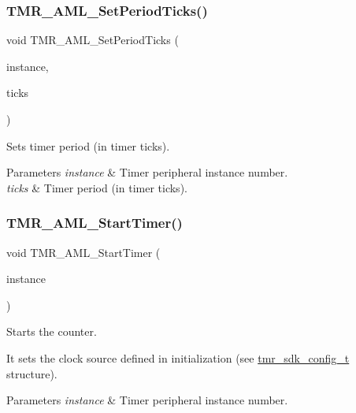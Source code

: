 \subsubsection{\texorpdfstring{TMR\_AML\_SetPeriodTicks()}{TMR\_AML\_SetPeriodTicks()}}
{\footnotesize\ttfamily void T\+M\+R\+\_\+\+A\+M\+L\+\_\+\+Set\+Period\+Ticks (\begin{DoxyParamCaption}\item[{\mbox{\hyperlink{common__aml_8h_a562bd37c7d07adcedec5993bc0cd96e5}{aml\+\_\+instance\+\_\+t}}}]{instance,  }\item[{uint32\+\_\+t}]{ticks }\end{DoxyParamCaption})}



Sets timer period (in timer ticks). 


\begin{DoxyParams}{Parameters}
{\em instance} & Timer peripheral instance number. \\
\hline
{\em ticks} & Timer period (in timer ticks). \\
\hline
\end{DoxyParams}
\mbox{\label{group__function__group_ga6ada6000f053895016184421976d8b74}} 
\subsubsection{\texorpdfstring{TMR\_AML\_StartTimer()}{TMR\_AML\_StartTimer()}}
{\footnotesize\ttfamily void T\+M\+R\+\_\+\+A\+M\+L\+\_\+\+Start\+Timer (\begin{DoxyParamCaption}\item[{\mbox{\hyperlink{common__aml_8h_a562bd37c7d07adcedec5993bc0cd96e5}{aml\+\_\+instance\+\_\+t}}}]{instance }\end{DoxyParamCaption})}



Starts the counter. 

It sets the clock source defined in initialization (see \mbox{\hyperlink{structtmr__sdk__config__t}{tmr\+\_\+sdk\+\_\+config\+\_\+t}} structure).


\begin{DoxyParams}{Parameters}
{\em instance} & Timer peripheral instance number. \\
\hline
\end{DoxyParams}
\mbox{\label{group__function__group_ga8ef7bbe3180ad4f34ac8a3a8c7db9bd3}} 
